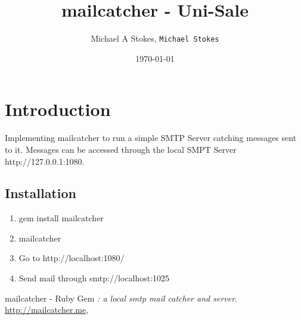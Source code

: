 \documentclass[11pt]{article}
\title{mailcatcher - Uni-Sale}
\author{Michael A Stokes, \texttt{Michael Stokes}}
\date{\today}
\begin{document}
\maketitle

\section{Introduction}
Implementing mailcatcher to run a simple SMTP Server catching
messages sent to it. Messages can be accessed through the
local SMPT Server http://127.0.0.1:1080.


\subsection{Installation}

\begin{enumerate}
\item gem install mailcatcher
\item mailcatcher
\item Go to http://localhost:1080/
\item Send mail through smtp://localhost:1025
\end{enumerate}

\begin{thebibliography}{9}

  mailcatcher - Ruby Gem
  \emph{: a local smtp mail catcher and server}.
  {\url{http://mailcatcher.me}},
\end{thebibliography}
\end{document}
